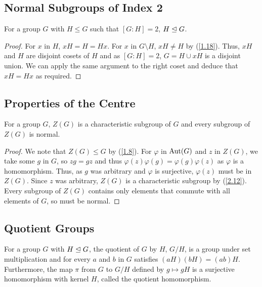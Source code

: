 \subsection{Normal Subgroups of Index 2} \label{2.11}

For a group $G$ with $H \leq G$ such that $[G : H] = 2$, $H \trianglelefteq G$.

\begin{proof}
    For $x$ in $H$, $xH = H = Hx$.
    For $x$ in $G \setminus H$, $xH \neq H$ by (\ref{1.18}).
    Thus, $xH$ and $H$ are disjoint cosets of $H$ and as $[G : H] = 2$, 
    $G = H \cup xH$ is a disjoint union. We can apply the same argument 
    to the right coset and deduce that $xH = Hx$ as required.
\end{proof}

\subsection{Properties of the Centre} \label{2.13}

For a group $G$, $Z(G)$ is a characteristic subgroup of $G$ and every
subgroup of $Z(G)$ is normal.


\begin{proof}
    We note that $Z(G) \leq G$ by (\ref{1.8}). For $\varphi$ in $\operatorname{Aut}(G)$ and $z$
    in $Z(G)$, we take some $g$ in $G$, so $zg = gz$ and thus 
    $\varphi(z)\varphi(g) = \varphi(g)\varphi(z)$ as 
    $\varphi$ is a homomorphism. Thus, as $g$ was arbitrary and $\varphi$ is surjective, 
    $\varphi(z)$ must be in $Z(G)$. Since $z$ was arbitrary, $Z(G)$
    is a characteristic subgroup by (\ref{2.12}).
    \\[\baselineskip]
    Every subgroup of $Z(G)$ contains only elements that commute with
    all elements of $G$, so must be normal.
\end{proof}

\subsection{Quotient Groups} \label{2.18}

For a group $G$ with $H \trianglelefteq G$, the quotient of $G$ by $H$, 
$G / H$, is a group under
set multiplication and for every $a$ and $b$ in $G$ satisfies
$(aH)(bH) = (ab)H$. Furthermore, the map $\pi$ from $G$ to $G / H$
defined by $g \mapsto gH$ is a surjective homomorphism with
kernel $H$, called the quotient homomorphism.

